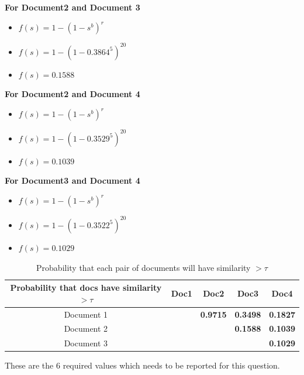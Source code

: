 \documentclass[11pt]{article}
\begin{document}
\begin{itemize}
\textbf{For Document2 and Document 3}
\begin{itemize}
	\item[] $f(s)=1-(1-s^{b})^{r}$
	\item[] $f(s)=1-(1-0.3864^{5})^{20}$
	\item[] $\boxed{f(s)=0.1588}$\\
\end{itemize}



\textbf{For Document2 and Document 4}
\begin{itemize}
	\item[] $f(s)=1-(1-s^{b})^{r}$
	\item[] $f(s)=1-(1-0.3529^{5})^{20}$
	\item[] $\boxed{f(s)=0.1039}$\\
\end{itemize}

\textbf{For Document3 and Document 4}
\begin{itemize}
	\item[] $f(s)=1-(1-s^{b})^{r}$
	\item[] $f(s)=1-(1-0.3522^{5})^{20}$
	\item[] $\boxed{f(s)=0.1029}$\\
\end{itemize}



\begin{table}[h]
	\centering
	\begin{tabular}{|c|c|c|c|c|}
		\hline
		\textbf{Probability that docs have similarity  $ > \tau$}  & \textbf{Doc1} & \textbf{Doc2} & \textbf{Doc3} & \textbf{Doc4}  \\
		\hline
		Document 1&    &  \textbf{0.9715}   &  \textbf{0.3498}     &  \textbf{0.1827}  \\
		\hline
		Document 2&      &      &  \textbf{0.1588}    &  \textbf{0.1039}    \\
		\hline
		Document 3&      &     &    &  \textbf{0.1029}   \\
		\hline
	\end{tabular}
	\caption{Probability that each pair of documents will have similarity $ > \tau $}
	\label{t2}
\end{table}

These are the 6 required values which needs to be reported for this question.

\end{itemize}
\end{document}
